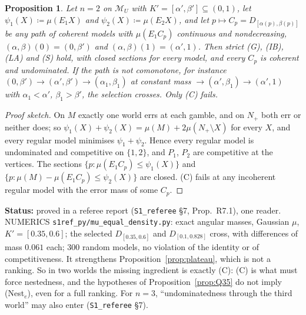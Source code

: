 \documentclass[11pt]{article}
\newtheorem{proposition}[theorem]{Proposition}
\theoremstyle{definition}
\theoremstyle{remark}
\newcommand{\M}{\mathcal M}
\newcommand{\src}[1]{\texttt{#1}}
\newcommand{\status}[1]{\par\smallskip\noindent\textbf{Status:} #1\par\smallskip}
\begin{document}
\begin{proposition}\label{prop:R71}
Let $n=2$ on $\M_U$ with $K'=[\alpha',\beta']\subseteq(0,1)$, let $\psi_1(X)\coloneqq\mu(E_1X)$ and $\psi_2(X)\coloneqq\mu(E_2X)$, and let $p\mapsto C_p=D_{[\alpha(p),\beta(p)]}$ be any path of coherent models with $\mu(E_1C_p)$ continuous and nondecreasing, $(\alpha,\beta)(0)=(0,\beta')$ and $(\alpha,\beta)(1)=(\alpha',1)$. Then strict (G), (IB), (LA) and (S) hold, with closed sections for every model, and every $C_p$ is coherent and undominated. If the path is not comonotone, for instance $(0,\beta')\to(\alpha',\beta')\to(\alpha_1,\beta_1)$ at constant mass $\to(\alpha',\beta_1)\to(\alpha',1)$ with $\alpha_1<\alpha'$, $\beta_1>\beta'$, the selection crosses. Only (C) fails.
\end{proposition}
\begin{proof}[Proof sketch]
On $M$ exactly one world errs at each gamble, and on $N_+$ both err or neither does; so $\psi_1(X)+\psi_2(X)=\mu(M)+2\mu(N_+\setminus X)$ for every $X$, and every regular model minimises $\psi_1+\psi_2$. Hence every regular model is undominated and competitive on $\{1,2\}$, and $P_1$, $P_2$ are competitive at the vertices. The sections $\{p:\mu(E_1C_p)\le\psi_1(X)\}$ and $\{p:\mu(M)-\mu(E_1C_p)\le\psi_2(X)\}$ are closed. (C) fails at any incoherent regular model with the error mass of some $C_p$.
\end{proof}
\status{proved in a referee report (\src{S1\_referee} \S7, Prop.~R7.1), one reader. NUMERICS \src{s1ref\_py/mu\_equal\_density.py}: exact angular masses, Gaussian $\mu$, $K'=[0.35,0.6]$; the selected $D_{[0.35,0.6]}$ and $D_{[0.1,0.828]}$ cross, with differences of mass $0.061$ each; 300 random models, no violation of the identity or of competitiveness. It strengthens Proposition~\ref{prop:plateau}, which is not a ranking. So in two worlds the missing ingredient is exactly (C): (C) is what must force nestedness, and the hypotheses of Proposition~\ref{prop:Q35} do not imply (Nest$_e$), even for a full ranking. For $n=3$, ``undominatedness through the third world'' may also enter (\src{S1\_referee} \S7).}
\end{document}
